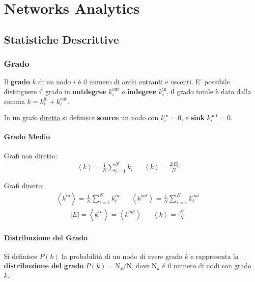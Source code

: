 \chapter{Networks Analytics}

\section{Statistiche Descrittive}

\subsection*{Grado}
Il \textbf{grado} $k$ di un nodo $i$ è il numero di archi entranti e uscenti.
E' possibile distinguere il grado in \textbf{outdegree} $k_i^{\text{out}}$ e \textbf{indegree} $k_i^{\text{in}}$, il grado totale è dato dalla somma $k = k_i^{\text{in}} + k_i^{\text{out}}$.

In un grafo \underline{diretto} si definisce \textbf{source} un nodo con $k_i^{\text{in}} = 0$, e \textbf{sink} $k_i^{\text{out}} = 0$.

\subsubsection*{Grado Medio}

Grafi non diretto:
\begin{align*}
   & \left\langle k \right\rangle = \frac{1}{N} \sum_{i=1}^N k_i &
   & \left\langle k \right\rangle = \frac{2|E|}{N}               &
\end{align*}

Grafi diretto:
\begin{align*}
   & \left\langle k^{in} \right\rangle = \frac{1}{N} \sum_{i=1}^N k_i^{in}   &
   & \left\langle k^{out} \right\rangle = \frac{1}{N} \sum_{i=1}^N k_i^{out} &
\end{align*}
\begin{align*}
   & |E| = \left\langle k^{in} \right\rangle = \left\langle k^{out} \right\rangle &
   & \left\langle k \right\rangle = \frac{|E|}{N}                                 &
\end{align*}

\subsubsection*{Distribuzione del Grado}
Si definisce $P(k)$ la probabilità di un nodo di avere grado $k$ e rappresenta la \textbf{distribuzione del grado} $P(k) = \text{N}_k / \text{N}$, dove $\text{N}_k$ é il numero di nodi con grado $k$.

